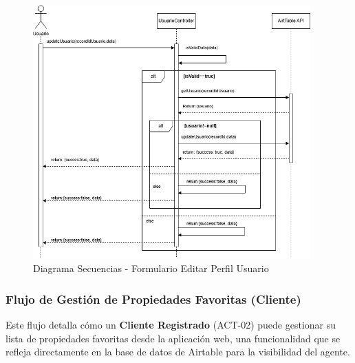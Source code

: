 \begin{figure}[H]
    \begin{center}
        \includegraphics[width = 0.95\textwidth]{Figuras/diagramasecuenciasformularioeditarperfilusuario.png}
    \end{center}
    \caption{\label{fig:diagramasecuenciasformularioeditarperfilusuario} Diagrama Secuencias - Formulario Editar Perfil Usuario}
\end{figure}


\subsubsection{Flujo de Gestión de Propiedades Favoritas (Cliente)}


Este flujo detalla cómo un \textbf{Cliente Registrado} (ACT-02) puede gestionar su lista de propiedades favoritas desde la aplicación web, una funcionalidad que se refleja directamente en la base de datos de Airtable para la visibilidad del agente.

